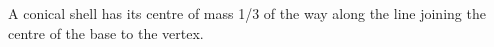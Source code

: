  A conical shell has its centre of mass 1/3 of the way along
the line joining the centre of the base to the vertex.

